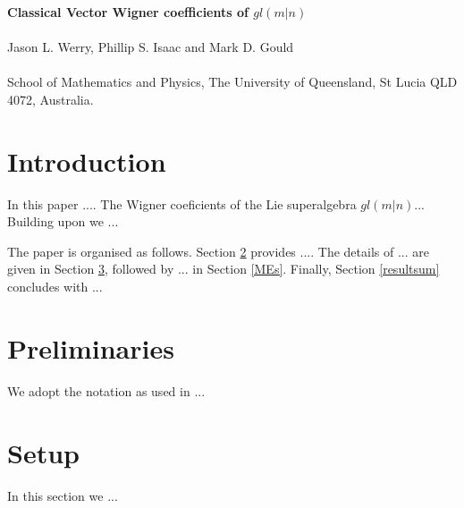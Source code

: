 \documentclass[12pt]{article}
\begin{document}
\begin{center}
{\large\bf Classical Vector Wigner coefficients of $gl(m|n)$}\\
~~\\

{\large Jason L. Werry, Phillip S. Isaac and Mark D. Gould}\\
~~\\

School of Mathematics and Physics, The University of Queensland, St Lucia QLD 4072, Australia.
\end{center}

\begin{abstract}
Wigner Coefficients are ...
\end{abstract}

% 

\section{Introduction}
 
In this paper ....  The Wigner coeficients of the Lie superalgebra $gl(m|n)$...  Building upon \cite{GIW2} we ...

The paper is organised as follows. Section \ref{prelim} provides .... The details of ...
are given in Section \ref{branch}, followed by ... in Section \ref{MEs}. Finally, Section \ref{resultsum} concludes with ...  


\section{Preliminaries}
\label{prelim}

We adopt the notation as used in \cite{GIW1,GIW2} ...



\section{Setup} 
\label{branch}
In this section we ...
\end{document}
